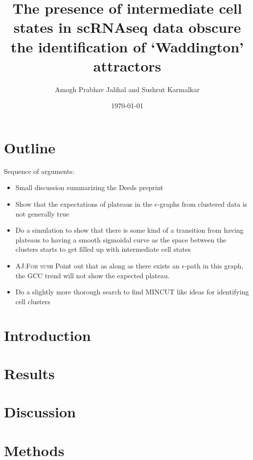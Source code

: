 \documentclass[11pt]{article}
\author{Amogh Prabhav Jalihal and Sushrut Karmalkar}
\date{\today}
\title{\amogh{wip} The presence of intermediate cell states in scRNAseq data obscure the identification of `Waddington' attractors }
\newcommand{\amogh}[1]{{\textsc{\color{blue} AJ:#1}}}
\newcommand{\todo}{{\color{red}{\small TODO\ }}}}
\begin{document}
\maketitle
\section*{Outline}
Sequence of arguments:
\begin{itemize}
\item \todo Small discussion summarizing the Deeds preprint
\item \todo Show that the expectations of plateaus in the $\epsilon$-graphs from clustered data is not generally true
\item \todo Do a simulation to show that there is some kind of a transition from having plateaus to having a smooth sigmoidal curve as the space between the clusters starts to get filled up with intermediate cell states
\item \todo \amogh{For sush} Point out that as along as there exists an $\epsilon$-path in this graph, the GCC trend will not show the expected plateau.
\item \todo Do a slightly more thorough search to find \textsc{MINCUT} like ideas for identifying cell clusters
\end{itemize}


 
\section*{Introduction}
\label{sec:orgc8a6b0e}
\section*{Results}
\label{sec:org8da0183}
\section*{Discussion}
\label{sec:org4e03e49}

\section*{Methods}
\label{sec:org7a0bf76}


\end{document}
